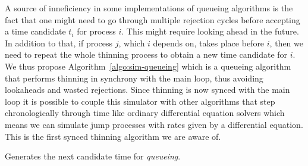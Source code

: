 \documentclass{juliacon}
\numberwithin{equation}{section}
\newcommand\ubar[1]{\stackunder[1.2pt]{\(#1\)}{\rule{.8ex}{.075ex}}}
\begin{document}
A source of inneficiency in some implementations of queueing algorithms is the fact that one might need to go through multiple rejection cycles before accepting a time candidate \( t_i \) for process \( i \). This might require looking ahead in the future. In addition to that, if process \( j \), which \( i \) depends on, takes place before \( i \), then we need to repeat the whole thinning process to obtain a new time candidate for \( i \). We thus propose Algorithm~\ref{algo:sim-queueing} which is a queueing algorithm that performs thinning in synchrony with the main loop, thus avoiding lookaheads and wasted rejections. Since thinning is now synced with the main loop it is possible to couple this simulator with other algorithms that step chronologically through time like ordinary differential equation solvers which means we can simulate jump processes with rates given by a differential equation. This is the first synced thinning algorithm we are aware of.

\begin{algorithm}[h]
\caption{Generates the next candidate time for \textit{queueing}.}
\label{algo:next-time-queueing}
\end{algorithm}
\end{document}
